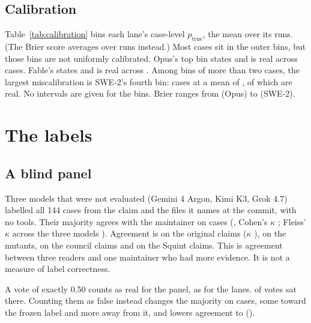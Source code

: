 \documentclass[11pt]{article}
\begin{document}
\subsection{Calibration}

Table~\ref{tab:calibration} bins each lane's case-level $p_{\text{true}}$, the mean over its runs. (The Brier score averages over runs instead.) Most cases sit in the outer bins, but those bins are not uniformly calibrated. Opus's top bin states  and is  real across  cases. Fable's states  and is  real across . Among bins of more than two cases, the largest miscalibration is SWE-2's fourth bin:  cases at a mean of , of which  are real. No intervals are given for the bins. Brier ranges from  (Opus) to  (SWE-2).

\begin{table}[h]
\centering\small

\caption{Case-level calibration: cases in the bin, mean $p_{\text{true}}$ / share real.}
\label{tab:calibration}
\end{table}

\section{The labels}
\label{sec:labels}

\subsection{A blind panel}

Three models that were not evaluated (Gemini 4 Argon, Kimi K3, Grok 4.7) labelled all 144 cases from the claim and the files it names at the commit, with no tools. Their majority agrees with the maintainer on  cases (, Cohen's $\kappa$  \citep{cohen1960}; Fleiss' $\kappa$  across the three models \citep{fleiss1971}). Agreement is  on the original claims ($\kappa$ ),  on the mutants,  on the council claims and  on the Squint claims. This is agreement between three readers and one maintainer who had more evidence. It is not a measure of label correctness.

A vote of exactly 0.50 counts as real for the panel, as for the lanes.  of  votes sat there. Counting them as false instead changes the majority on  cases, some toward the frozen label and more away from it, and lowers agreement to  ().
\end{document}
